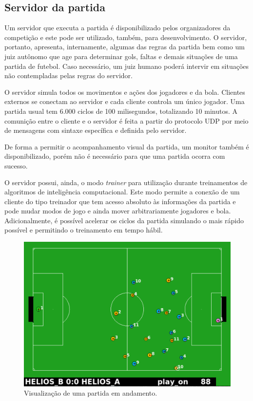 \subsection{Servidor da partida}
\label{subsec:server}
\par Um servidor que executa a partida é disponibilizado pelos organizadores da competição e este pode ser utilizado, também, para desenvolvimento. O servidor, portanto, apresenta, internamente, algumas das regras da partida bem como um juiz autônomo que age para determinar gols, faltas e demais situações de uma partida de futebol. Caso necessário, um juiz humano poderá intervir em situações não contempladas pelas regras do servidor.
\par O servidor simula todos os movimentos e ações dos jogadores e da bola. Clientes externos se conectam ao servidor e cada cliente controla um único jogador. Uma partida usual tem 6.000 ciclos de 100 milisegundos, totalizando 10 minutos. A comunição entre o cliente e o servidor é feita a partir do protocolo UDP por meio de mensagens com sintaxe específica e definida pelo servidor.
\par De forma a permitir o acompanhamento visual da partida, um monitor também é disponibilizado, porém não é necessário para que uma partida ocorra com sucesso.
\par O servidor possui, ainda, o modo \textit{trainer} para utilização durante treinamentos de algoritmos de inteligência computacional. Este modo permite a conexão de um cliente do tipo treinador que tem acesso absoluto às informações da partida e pode mudar modos de jogo e ainda mover arbitrariamente jogadores e bola. Adicionalmente, é possível acelerar os ciclos da partida simulando o mais rápido possível e permitindo o treinamento em tempo hábil.

\begin{figure}[h]
	\includegraphics[width=0.9\linewidth]{figs/server.png}
	\centering
	\caption{Visualização de uma partida em andamento.}
	\label{fig:rcssserver}
\end{figure}

